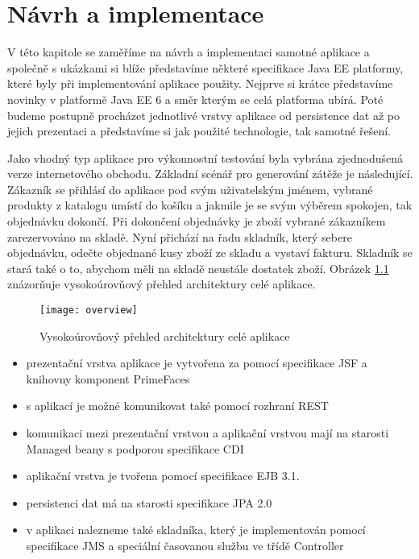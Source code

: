 \documentclass[122pt,oneside]{fithesis}
\begin{document}
\chapter{Návrh a implementace}
V této kapitole se zaměříme na návrh a implementaci samotné aplikace a společně s ukázkami si blíže představíme některé specifikace Java EE platformy, které byly při implementování aplikace použity. Nejprve si krátce představíme novinky v platformě Java EE 6 a směr kterým se celá platforma ubírá. Poté budeme postupně procházet jednotlivé vrstvy aplikace od persistence dat až po jejich prezentaci a představíme si jak použité technologie, tak samotné řešení.

Jako vhodný typ aplikace pro výkonnostní testování byla vybrána zjednodušená verze internetového obchodu. Základní scénář pro generování zátěže je následující. Zákazník se přihlásí do aplikace pod svým uživatelským jménem, vybrané produkty z katalogu umístí do košíku a jakmile je se svým výběrem spokojen, tak objednávku dokončí. Při dokončení objednávky je zboží vybrané zákazníkem zarezervováno na skladě. Nyní přichází na řadu skladník, který sebere objednávku, odečte objednané kusy zboží ze skladu a vystaví fakturu. Skladník se stará také o to, abychom měli na skladě neustále dostatek zboží. Obrázek \ref{fig:overview} znázorňuje vysokoúrovňový přehled architektury celé aplikace.

\begin{figure}[!ht]
\centering
\texttt{[image: overview]}
\caption{Vysokoúrovňový přehled architektury celé aplikace}
\label{fig:overview}
\end{figure}

\begin{itemize}
  \item prezentační vrstva aplikace je vytvořena za pomocí specifikace JSF a knihovny komponent PrimeFaces
  \item s aplikací je možné komunikovat také pomocí rozhraní REST
  \item komunikaci mezi prezentační vrstvou a aplikační vrstvou mají na starosti Managed beany s podporou specifikace CDI
  \item aplikační vrstva je tvořena pomocí specifikace EJB 3.1.
  \item persistenci dat má na starosti specifikace JPA 2.0
  \item v aplikaci nalezneme také skladníka, který je implementován pomocí specifikace JMS a speciální časovanou službu ve třídě Controller
\end{itemize}
\end{document}
